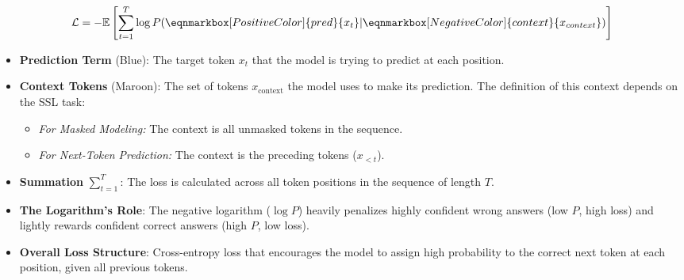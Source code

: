 \begin{tcolorbox}[
    title= Cross-Entropy Loss,
    breakable,
    enhanced,
    colback=white,
    colframe=black!30,
    colbacktitle=black!10,
    coltitle=black,
    fonttitle=\bfseries,
    boxrule=0.5mm,
    left=2mm,
    right=2mm,
    top=4mm,
    bottom=4mm,
    middle=10mm
]
\label{eq:nexttoken}
\begin{center}
\begin{minipage}{0.9\linewidth}
\begin{equation}
\mathcal{L} = 
-\mathbb{E} \left[ \sum_{t=1}^{T} 
\log P(\eqnmarkbox[PositiveColor]{pred}{x_t} | \eqnmarkbox[NegativeColor]{context}{x_{context}})
\right]
\label{eq:cross_entropy}
\end{equation}
\end{minipage}
\end{center}
\tcblower
\begin{itemize}
\item \textbf{Prediction Term} ({\color{PositiveColor}Blue}): The target token $x_t$ that the model is trying to predict at each position.
\item \textbf{Context Tokens} ({\color{NegativeColor}Maroon}): The set of tokens $x_{\text{context}}$ the model uses to make its prediction. The definition of this context depends on the SSL task:
            \begin{itemize}
                \item \textit{For Masked Modeling:} The context is all unmasked tokens in the sequence.
                \item \textit{For Next-Token Prediction:} The context is the preceding tokens ($x_{<t}$).     
            \end{itemize}
\item \textbf{Summation} $\sum_{t=1}^{T}$: The loss is calculated across all token positions in the sequence of length $T$.
\item \textbf{The Logarithm's Role}: The negative logarithm ($\log P$) heavily penalizes highly confident wrong answers (low $P$, high loss) and lightly rewards confident correct answers (high $P$, low loss).
\item \textbf{Overall Loss Structure}: Cross-entropy loss that encourages the model to assign high probability to the correct next token at each position, given all previous tokens.
\end{itemize}
\end{tcolorbox}

